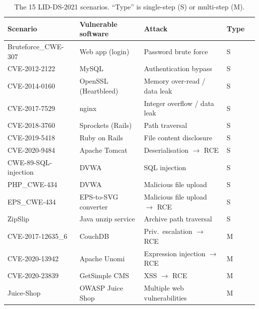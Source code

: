\documentclass{article}
\begin{document}
\begin{table}[t]
    \centering
    \begin{tabular}{lllll}
         \toprule
    Scenario & Vulnerable software & Attack & Type \\
    \midrule
    Bruteforce\_CWE-307   & Web app (login)          & Password brute force                    & S \\
    CVE-2012-2122         & MySQL                    & Authentication bypass                   & S \\
    CVE-2014-0160         & OpenSSL (Heartbleed)     & Memory over-read / data leak            & S \\
    CVE-2017-7529         & nginx                    & Integer overflow / data leak            & S \\
    CVE-2018-3760         & Sprockets (Rails)        & Path traversal                          & S \\
    CVE-2019-5418         & Ruby on Rails            & File content disclosure                 & S \\
    CVE-2020-9484         & Apache Tomcat            & Deserialisation $\rightarrow$ RCE       & S \\
    CWE-89-SQL-injection  & DVWA                     & SQL injection                           & S \\
    PHP\_CWE-434          & DVWA                     & Malicious file upload                   & S \\
    EPS\_CWE-434          & EPS-to-SVG converter     & Malicious file upload $\rightarrow$ RCE & S \\
    ZipSlip               & Java unzip service       & Archive path traversal                  & S \\
    CVE-2017-12635\_6     & CouchDB                  & Priv.\ escalation $\rightarrow$ RCE     & M \\
    CVE-2020-13942        & Apache Unomi             & Expression injection $\rightarrow$ RCE  & M \\
    CVE-2020-23839        & GetSimple CMS            & XSS $\rightarrow$ RCE                   & M \\
    Juice-Shop            & OWASP Juice Shop         & Multiple web vulnerabilities            & M \\
    \bottomrule
    \end{tabular}
    \caption{The 15 LID-DS-2021 scenarios. ``Type'' is single-step (S) or multi-step (M).}
    \label{tab:scenarios}
\end{table}
\end{document}
